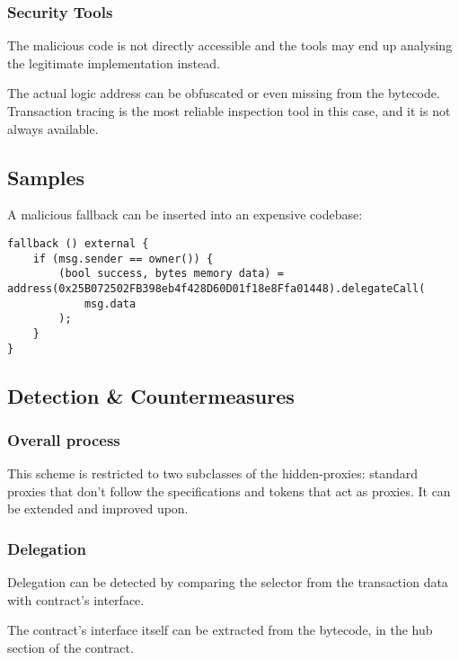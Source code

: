 \subsubsection{Security Tools}

The malicious code is not directly accessible and the tools may end up analysing the legitimate implementation instead.

The actual logic address can be obfuscated or even missing from the bytecode.
Transaction tracing is the most reliable inspection tool in this case, and it is not always available.

\subsection{Samples}

A malicious fallback can be inserted into an expensive codebase:

\begin{lstlisting}[language=Solidity]
fallback () external {
    if (msg.sender == owner()) {
        (bool success, bytes memory data) = address(0x25B072502FB398eb4f428D60D01f18e8Ffa01448).delegateCall(
            msg.data
        );
    }
}
\end{lstlisting}

\subsection{Detection \& Countermeasures}

\subsubsection{Overall process}

\hspace*{-1.5cm}


This scheme is restricted to two subclasses of the hidden-proxies: standard proxies that don't follow the specifications and tokens that act as proxies.
It can be extended and improved upon.

\subsubsection{Delegation}

Delegation can be detected by comparing the selector from the transaction data with contract's interface.

The contract's interface itself can be extracted from the bytecode, in the hub section of the contract.

